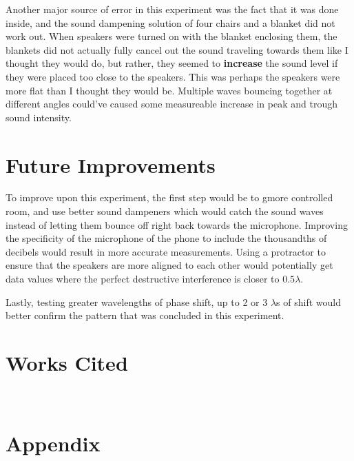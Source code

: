 \documentclass[index]{subfiles}
\begin{document}
Another major source of error in this experiment was the fact that it was done inside, and the sound dampening solution of four chairs and a blanket did not work out. When speakers were turned on with the blanket enclosing them, the blankets did not actually fully cancel out the sound traveling towards them like I thought they would do, but rather, they seemed to \textbf{increase} the sound level if they were placed too close to the speakers. This was perhaps the speakers were more flat than I thought they would be. Multiple waves bouncing together at different angles could've caused some measureable increase in peak and trough sound intensity.


\section{Future Improvements}

To improve upon this experiment, the first step would be to gmore controlled room, and use better sound dampeners which would catch the sound waves instead of letting them bounce off right back towards the microphone. Improving the specificity of the microphone of the phone to include the thousandths of decibels would result in more accurate measurements. Using a protractor to ensure that the speakers are more aligned to each other would potentially get data values where the perfect destructive interference is closer to \(0.5\lambda\).

Lastly, testing greater wavelengths of phase shift, up to 2 or 3 \(\lambda\)s of shift would better confirm the pattern that was concluded in this experiment.

\section{Works Cited}

\printbibliography\

\section{Appendix}
\end{document}
